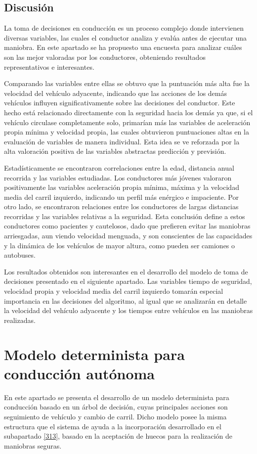 \subsection{Discusión}\label{513}
La toma de decisiones en conducción es un proceso complejo donde intervienen diversas variables, las cuales el conductor analiza y evalúa antes de ejecutar una maniobra. En este apartado se ha propuesto una encuesta para analizar cuáles son las mejor valoradas por los conductores, obteniendo resultados representativos e interesantes.

Comparando las variables entre ellas se obtuvo que la puntuación más alta fue la velocidad del vehículo adyacente, indicando que las acciones de los demás vehículos influyen significativamente sobre las decisiones del conductor. Este hecho está relacionado directamente con la seguridad hacia los demás ya que, si el vehículo circulase completamente solo, primarían más las variables de aceleración propia mínima y velocidad propia, las cuales obtuvieron puntuaciones altas en la evaluación de variables de manera individual. Esta idea se ve reforzada por la alta valoración positiva de las variables abstractas predicción y previsión.

Estadísticamente se encontraron correlaciones entre la edad, distancia anual recorrida y las variables estudiadas. Los conductores más jóvenes valoraron positivamente las variables aceleración propia mínima, máxima y la velocidad media del carril izquierdo, indicando un perfil más enérgico e impaciente. Por otro lado, se encontraron relaciones entre los conductores de largas distancias recorridas y las variables relativas a la seguridad.  Esta conclusión define a estos conductores como pacientes y cautelosos, dado que prefieren evitar las maniobras arriesgadas, aun viendo velocidad menguada, y son conscientes de las capacidades y la dinámica de los vehículos de mayor altura, como pueden ser camiones o autobuses. 

Los resultados obtenidos son interesantes en el desarrollo del modelo de toma de decisiones presentado en el siguiente apartado. Las variables tiempo de seguridad, velocidad propia y velocidad media del carril izquierdo tomarán especial importancia en las decisiones del algoritmo, al igual que se analizarán en detalle la velocidad del vehículo adyacente y los tiempos entre vehículos en las maniobras realizadas.

\section{Modelo determinista para conducción autónoma }\label{52}
En este apartado se presenta el desarrollo de un modelo determinista para conducción basado en un árbol de decisión, cuyas principales acciones son seguimiento de vehículo y cambio de carril. Dicho modelo posee la misma estructura que el sistema de ayuda a la incorporación desarrollado en el subapartado \ref{313}, basado en la aceptación de huecos para la realización de maniobras seguras. 

